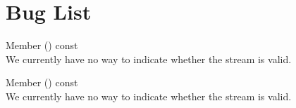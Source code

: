 \chapter{Bug List}
\hypertarget{bug}{}\label{bug}

\begin{DoxyRefList}
\item[Member \doxylink{classtracktable_1_1_point_reader_af579f3b6366705e58565f87c32779433}{tracktable\+::Point\+Reader\texorpdfstring{$<$}{<} PointT \texorpdfstring{$>$}{>}\+::input} () const]\hfill \\
\label{bug__bug000001}%
%
 We currently have no way to indicate whether the stream is valid. 
\item[Member \doxylink{classtracktable_1_1_trajectory_reader_a9da4fdcfe6eb712498752d0e00333e3d}{tracktable\+::Trajectory\+Reader\texorpdfstring{$<$}{<} TrajectoryT \texorpdfstring{$>$}{>}\+::input} () const]\hfill \\
\label{bug__bug000002}%
%
 We currently have no way to indicate whether the stream is valid.
\end{DoxyRefList}
